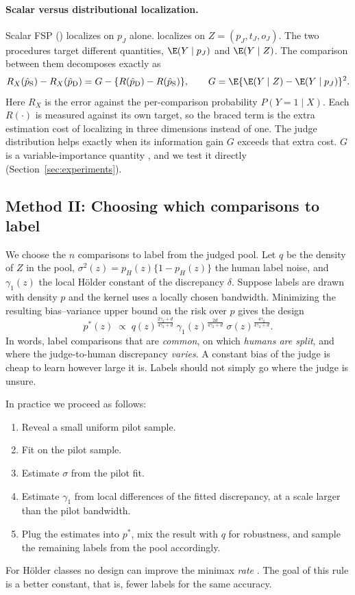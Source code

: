 \paragraph{Scalar versus distributional localization.}
Scalar FSP (\sfsp) localizes on $p_J$ alone. \dfsp{} localizes on $Z=(p_J,t_J,o_J)$. The two
procedures target different quantities, $\E(Y\mid p_J)$ and $\E(Y\mid Z)$. The comparison between
them decomposes exactly as
\[
  R_X(\hat p_{\mathrm S})-R_X(\hat p_{\mathrm D})
  =G-\{R(\hat p_{\mathrm D})-R(\hat p_{\mathrm S})\},
  \qquad
  G=\E\{\E(Y\mid Z)-\E(Y\mid p_J)\}^2 .
\]
Here $R_X$ is the error against the per-comparison probability $P(Y=1\mid X)$. Each $R(\cdot)$ is
measured against its own target, so the braced term is the extra estimation cost of localizing in
three dimensions instead of one. The judge distribution helps exactly when its information gain
$G$ exceeds that extra cost. $G$ is a variable-importance quantity
\citep{williamson2021nonparametric,williamson2023general}, and we test it directly
(Section~\ref{sec:experiments}).

\subsection{Method II: Choosing which comparisons to label}
\label{sec:acquisition}

We choose the $n$ comparisons to label from the judged pool. Let $q$ be the density of $Z$ in the
pool, $\sigma^2(z)=p_H(z)\{1-p_H(z)\}$ the human label noise, and $\gamma_1(z)$ the local
H\"older constant of the discrepancy $\delta$. Suppose labels are drawn with density $p$ and the
kernel uses a locally chosen bandwidth. Minimizing the resulting bias--variance upper bound on the
risk over $p$ gives the design
\[
  p^{*}(z)\;\propto\;q(z)^{\frac{2\gamma_2+d}{4\gamma_2+d}}\;
  \gamma_1(z)^{\frac{2d}{4\gamma_2+d}}\;\sigma(z)^{\frac{4\gamma_2}{4\gamma_2+d}} .
\]
In words, label comparisons that are \emph{common}, on which \emph{humans are split}, and where
the judge-to-human discrepancy \emph{varies}. A constant bias of the judge is cheap to learn
however large it is. Labels should not simply go where the judge is unsure.

In practice we proceed as follows:
\begin{enumerate}
  \item Reveal a small uniform pilot sample.
  \item Fit \dfsp{} on the pilot sample.
  \item Estimate $\sigma$ from the pilot fit.
  \item Estimate $\gamma_1$ from local differences of the fitted discrepancy, at a scale larger than
        the pilot bandwidth.
  \item Plug the estimates into $p^{*}$, mix the result with $q$ for robustness, and sample the
        remaining labels from the pool accordingly.
\end{enumerate}
For H\"older classes no design can improve the minimax \emph{rate} \citep{castro2005faster}. The
goal of this rule is a better constant, that is, fewer labels for the same accuracy.

